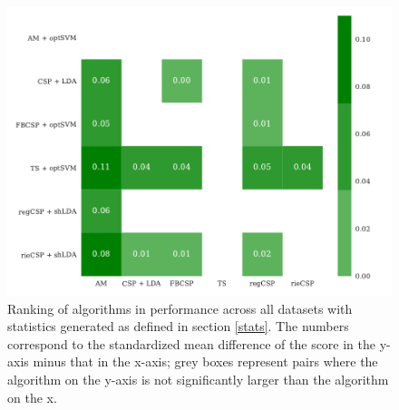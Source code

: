 \begin{figure}
    \centering
    \includegraphics[width=\textwidth]{Figures/ordering.pdf}
    \caption{Ranking of algorithms in performance across all datasets with
      statistics generated as defined in section \ref{stats}. The numbers
      correspond to the standardized mean difference of the score in the y-axis
      minus that in the x-axis; grey boxes represent pairs where the algorithm
      on the y-axis is not significantly larger than the algorithm on the x. }
    \label{fig:rank}
\end{figure}


